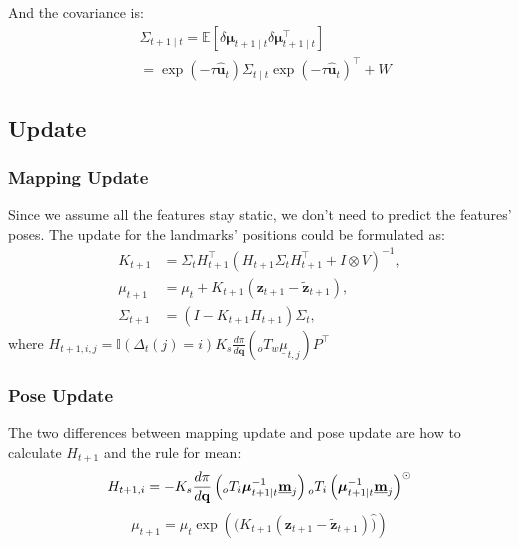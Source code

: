\documentclass[conference]{IEEEtran}
\begin{document}
And the covariance is:
\begin{equation}
    \begin{aligned}
    &\Sigma_{t+1 \mid t} =\mathbb{E}\left[\delta \boldsymbol{\mu}_{t+1 \mid t} \delta \boldsymbol{\mu}_{t+1 \mid t}^{\top}\right] \\
    &=\exp \left(-\tau \hat{\mathbf{u}}_t\right) \Sigma_{t \mid t} \exp \left(-\tau \hat{\mathbf{u}}_t\right)^{\top}+W
    \end{aligned}
\end{equation}

\subsection{Update}
\subsubsection{Mapping Update}
Since we assume all the features stay static, we don't need to predict the features' poses. The update for the landmarks' 
positions could be formulated as:
\begin{equation}
    \begin{aligned}
    K_{t+1} & =\Sigma_t H_{t+1}^{\top}\left(H_{t+1} \Sigma_t H_{t+1}^{\top}+I \otimes V\right)^{-1}, \\
    \mu_{t+1} & =\mu_t+K_{t+1}\left(\mathbf{z}_{t+1}-\tilde{\mathbf{z}}_{t+1}\right), \\
    \Sigma_{t+1} & =\left(I-K_{t+1} H_{t+1}\right) \Sigma_t,
    \end{aligned}
\end{equation}
where $H_{t+1, i, j} = \mathbb{I}(\Delta_t(j) = i) K_s \frac{d\pi}{d\mathbf{q}}(_{o}T_{w}\underline{\mu}_{t,j})P^{\top}$

\subsubsection{Pose Update}
The two differences between mapping update and pose update are how to calculate $H_{t+1}$ and the rule for mean:
\begin{equation}
    H_{t+1, i}=-K_s \frac{d \pi}{d \mathbf{q}}\left( _oT_i \boldsymbol{\mu}_{t+1 \mid t}^{-1} \underline{\mathbf{m}}_j\right) \prescript{}{o}{T_i}\left(\boldsymbol{\mu}_{t+1 \mid t}^{-1} \underline{\mathbf{m}}_j\right)^{\odot}
\end{equation}
\begin{equation}
    \mu_{t+1} =\mu_t\exp\left((K_{t+1}\left(\mathbf{z}_{t+1}-\tilde{\mathbf{z}}_{t+1}\right)\hat)\right)
\end{equation}
\end{document}
